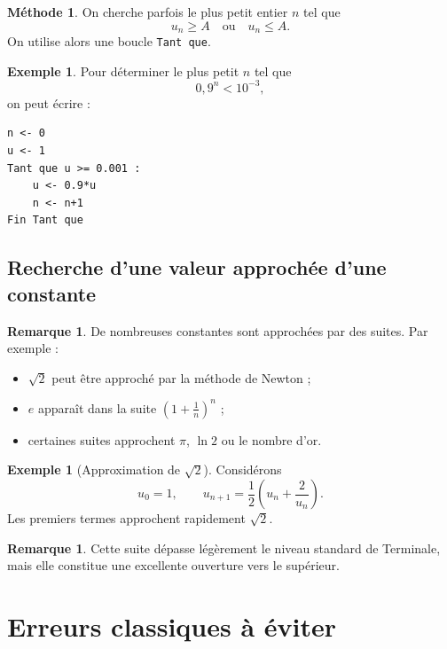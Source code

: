 \documentclass[11pt,a4paper]{article}
\theoremstyle{definition}
\newtheorem{exemple}[definition]{Exemple}
\newtheorem{remarque}[definition]{Remarque}
\newtheorem{methode}[definition]{Méthode}
\theoremstyle{plain}
\theoremstyle{remark}
\begin{document}
\begin{methode}
On cherche parfois le plus petit entier $n$ tel que
\[
u_n\geq A
\quad \text{ou} \quad
u_n\leq A.
\]
On utilise alors une boucle \texttt{Tant que}.
\end{methode}

\begin{exemple}
Pour déterminer le plus petit $n$ tel que
\[
0,9^n<10^{-3},
\]
on peut écrire :
\begin{verbatim}
n <- 0
u <- 1
Tant que u >= 0.001 :
    u <- 0.9*u
    n <- n+1
Fin Tant que
\end{verbatim}
\end{exemple}

\subsection{Recherche d'une valeur approchée d'une constante}

\begin{remarque}
De nombreuses constantes sont approchées par des suites.  
Par exemple :
\begin{itemize}[leftmargin=0.8cm]
    \item $\sqrt2$ peut être approché par la méthode de Newton ;
    \item $e$ apparaît dans la suite $\left(1+\frac1n\right)^n$ ;
    \item certaines suites approchent $\pi$, $\ln 2$ ou le nombre d'or.
\end{itemize}
\end{remarque}

\begin{exemple}[Approximation de \(\sqrt2\)]
Considérons
\[
u_0=1,\qquad u_{n+1}=\frac12\left(u_n+\frac2{u_n}\right).
\]
Les premiers termes approchent rapidement $\sqrt2$.
\end{exemple}

\begin{remarque}
Cette suite dépasse légèrement le niveau standard de Terminale, mais elle constitue une excellente ouverture vers le supérieur.
\end{remarque}

\section{Erreurs classiques à éviter}
\end{document}
